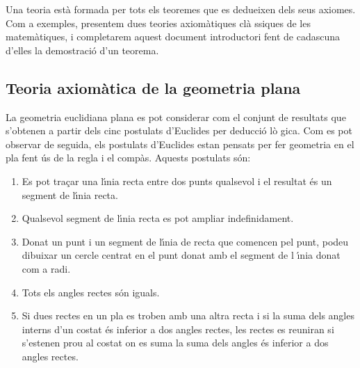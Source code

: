 \bigskip

Una teoria est\`{a} formada per tots els teoremes que es dedueixen dels seus
axiomes. Com a exemples, presentem dues teories axiom\`{a}tiques cl\`{a}%
ssiques de les matem\`{a}tiques, i completarem aquest document introductori
fent de cadascuna d'elles la demostraci\'{o} d'un teorema.

\subsection{Teoria axiom\`{a}tica de la geometria plana}

La geometria euclidiana plana es pot considerar com el conjunt de resultats
que s'obtenen a partir dels cinc postulats d'Euclides per deducci\'{o} l\`{o}%
gica. Com es pot observar de seguida, els postulats d'Euclides estan pensats
per fer geometria en el pla fent \'{u}s de la regla i el comp\`{a}s. Aquests
postulats s\'{o}n:

\begin{enumerate}
\item Es pot tra\c{c}ar una l\'{\i}nia recta entre dos punts qualsevol i el
resultat \'{e}s un segment de l\'{\i}nia recta.

\item Qualsevol segment de l\'{\i}nia recta es pot ampliar indefinidament.

\item Donat un punt i un segment de l\'{\i}nia de recta que comencen pel
punt, podeu dibuixar un cercle centrat en el punt donat amb el segment de l%
\'{\i}nia donat com a radi.

\item Tots els angles rectes s\'{o}n iguals.

\item Si dues rectes en un pla es troben amb una altra recta i si la suma
dels angles interns d'un costat \'{e}s inferior a dos angles rectes, les
rectes es reuniran si s'estenen prou al costat on es suma la suma dels
angles \'{e}s inferior a dos angles rectes.

\end{enumerate}

